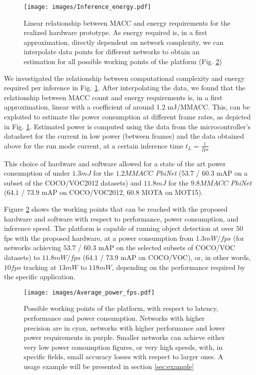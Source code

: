 \begin{figure}[htbp]
  \centering
  \texttt{[image: images/Inference\_energy.pdf]}
  \caption{Linear relationship between MACC and energy requirements for the realized hardware prototype. As energy required is, in a first approximation, directly dependent on network complexity, we can interpolate data points for different networks to obtain an estimation for all possible working points of the platform (Fig. \ref{fig:average_power_fps})}
  \label{fig:Inference_energy}
\end{figure}

We investigated the relationship between computational complexity and energy required per inference in Fig. \ref{fig:Inference_energy}. After interpolating the data, we found that the relationship between MACC count and energy requirements is, in a first approximation, linear with a coefficient of around 1.2 mJ/MMACC. This, can be exploited to estimate the power consumption at different frame rates, as depicted in Fig. \ref{fig:Inference_energy}. Estimated power is computed using the data from the microcontroller's datasheet for the current in low power (between frames) and the data obtained above for the run mode current, at a certain inference time $t_L=\frac{1}{fps}$


This choice of hardware and software allowed for a state of the art power consumption of under $1.3mJ$ for the $1.2MMACC$ \textit{PhiNet} ($53.7$ / $60.3$ mAP on a subset of the COCO/VOC2012 datasets) and $11.8mJ$ for the $9.8MMACC$ \textit{PhiNet} ($64.1$ / $73.9$ mAP on COCO/VOC2012, $60.8$ MOTA on MOT15).

Figure \ref{fig:average_power_fps} shows the working points that can be reached with the proposed hardware and software with respect to performance, power consumption, and inference speed. The platform is capable of running object detection at over $50$ fps with the proposed hardware, at a power consumption from $1.3mW/fps$ (for networks achieving $53.7$ / $60.3$ mAP on the selected subsets of COCO/VOC datasets) to $11.8mW/fps$ ($64.1$ / $73.9$ mAP on COCO/VOC), or, in other words, $10fps$ tracking at $13mW$ to $118mW$, depending on the performance required by the specific application.

\begin{figure}[ht]
  \centering
  \texttt{[image: images/Average\_power\_fps.pdf]}
  \caption{Possible working points of the platform, with respect to latency, performance and power consumption. Networks with higher precision are in cyan, networks with higher performance and lower power requirements in purple. Smaller networks can achieve either very low power consumption figures, or very high speeds, with, in specific fields, small accuracy losses with respect to larger ones. A usage example will be presented in section \ref{sec:example}}
  \label{fig:average_power_fps}
\end{figure}

